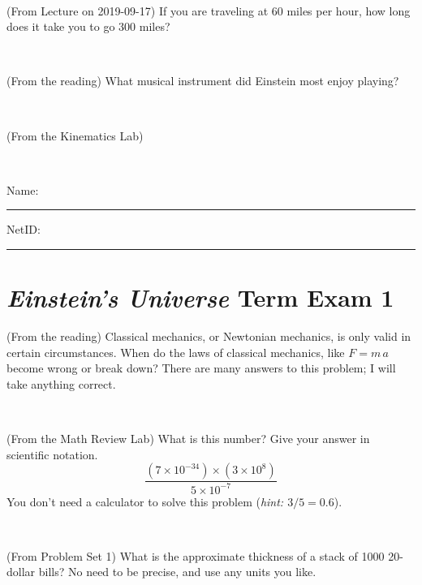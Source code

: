 \documentclass[12pt, letterpaper]{article}
\begin{document}
\vfill ~

\begin{problem} (From Lecture on 2019-09-17)
If you are traveling at 60 miles per hour, how long does
it take you to go 300 miles?
\end{problem}


\vfill ~

\begin{problem} (From the reading)
What musical instrument did Einstein most enjoy playing?
\end{problem}


\vfill ~

\begin{problem} (From the Kinematics Lab)

\end{problem}


\vfill ~


\cleardoublepage



\noindent
Name: \rule[-1ex]{0.60\textwidth}{0.1pt}
NetID: \rule[-1ex]{0.20\textwidth}{0.1pt}

\section*{\textsl{Einstein's Universe} Term Exam 1}
\setcounter{problem}{1}


\begin{problem} (From the reading)
Classical mechanics, or Newtonian mechanics, is only valid in certain
circumstances. When do the laws of classical mechanics, like $F =
m\,a$ become wrong or break down? There are many answers to this
problem; I will take anything correct.
\end{problem}


\vfill ~

\begin{problem} (From the Math Review Lab)
What is this number? Give your answer in scientific notation.
$$
\frac{(7\times10^{-34})\times(3\times10^8)}{5\times10^{-7}}
$$
You don't need a calculator to solve this problem (\textit{hint: $3/5=0.6$}).
\end{problem}


\vfill ~

\begin{problem} (From Problem Set 1)
What is the approximate thickness of a stack of 1000 20-dollar bills?
No need to be precise, and use any units you like.
\end{problem}
\end{document}
